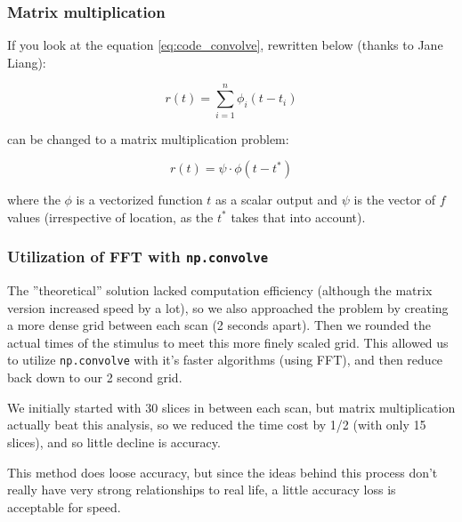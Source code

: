 \documentclass[11pt]{article}
\begin{document}
\subsubsection{Matrix multiplication}
If you look at the equation \ref{eq:code_convolve}, rewritten below (thanks to Jane Liang):

$$r(t)= \sum_{i=1}^n \phi_{i}(t-t_i)$$

can be changed to a matrix multiplication problem:

\begin{equation} \label{eq:matrix_code_convolve}
r(t)=  \psi \cdot \phi(t-t^*)
\end{equation}

where the $\phi$ is a vectorized function $t$ as a scalar output and $\psi$ is the vector of $f$ values (irrespective of location, as the $t^*$ takes that into account).


\subsubsection{Utilization of FFT with \texttt{np.convolve}}
The ''theoretical'' solution lacked computation efficiency (although the matrix version increased speed by a lot), so we also approached the problem by creating a more dense grid between each scan (2 seconds apart). Then we rounded the actual times of the stimulus to meet this more finely scaled grid. This allowed us to utilize \texttt{np.convolve} with it's faster algorithms (using FFT), and then reduce back down to our 2 second grid.

We initially started with 30 slices in between each scan, but matrix multiplication actually beat this analysis, so we reduced the time cost by 1/2 (with only 15 slices), and so little decline is accuracy.

This method does loose accuracy, but since the ideas behind this process don't really have very strong relationships to real life, a little accuracy loss is acceptable for speed.




\end{document}
